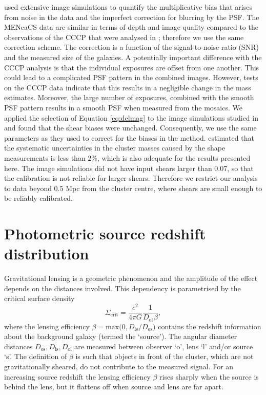 \documentclass[useAMS,usenatbib]{mnras}
\begin{document}
 used extensive image simulations to quantify the multiplicative bias that arises from noise in the data and the imperfect correction for blurring by the PSF. The MENeaCS data are similar in terms of depth and image quality compared to the observations of the CCCP that were analysed in ; therefore we use the same correction scheme. The correction is a function of the signal-to-noise ratio (SNR) and the measured size of the galaxies. A potentially important difference with the CCCP analysis is that the individual exposures are offset from one another. This could lead to a complicated PSF pattern in the combined images. However, tests on the CCCP data indicate that this results in a negligible change in the mass estimates. Moreover, the large number of exposures, combined with the smooth PSF pattern results in a smooth PSF when measured from the mosaics. We applied the selection of Equation \ref{eq:delmag} to the image simulations studied in  and found that the shear biases were unchanged. Consequently, we use the same parameters as they used to correct for the biases in the method.  estimated that the systematic uncertainties in the cluster masses caused by the shape measurements is less than $2\%$, which is also adequate for the results presented here. The image simulations did not have input shears larger than 0.07, so that the calibration is not reliable for larger shears. Therefore we restrict our analysis to data beyond 0.5 Mpc from the cluster centre, where shears are small enough to be reliably calibrated. 


\section{Photometric source redshift distribution}
\label{sec:photoz}

Gravitational lensing is a geometric phenomenon and the amplitude of the effect depends on the distances involved. This dependency is parametrised by the critical surface density
\begin{equation}
 \Sigma_\mathrm{crit} =\frac{c^2}{4 \pi G} \frac{1}{D_\mathrm{ol} \hspace{1pt} \beta }, 
 \label{eq:sigcrit}
\end{equation}
where the lensing efficiency $\beta = \mathrm{max(}0, D_\mathrm{ls}/D_\mathrm{os})$ contains the redshift information about the background galaxy (termed the `source'). The angular diameter distances $D_\mathrm{os}, D_\mathrm{ls}, D_\mathrm{ol}$ are measured between observer `o', lens `l' and/or source `s'. The definition of $\beta$ is such that objects in front of the cluster, which are not gravitationally sheared, do not contribute to the measured signal. For an increasing source redshift the lensing efficiency $\beta$ rises sharply when the source is behind the lens, but it flattens off when source and lens are far apart.
\end{document}
